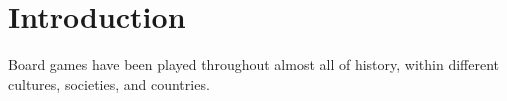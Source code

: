 \chapter{Introduction}
\label{chap:indledning}
Board games have been played throughout almost all of history, within different cultures, societies, and countries.







